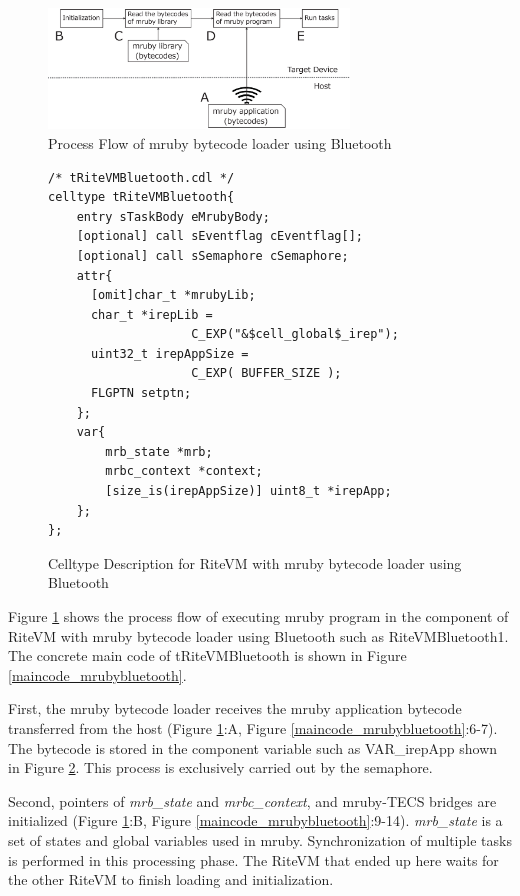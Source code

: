 \documentclass{sig-alternate-05-2015}
\begin{document}
\begin{figure}[t]
    \centering
    \includegraphics[width=8cm,clip]{figure/control_flow.eps}
    \caption{Process Flow of mruby bytecode loader using Bluetooth}
    \label{fig:control_flow}
\end{figure}

\begin{figure}[t]
\centering
\begin{lstlisting}
/* tRiteVMBluetooth.cdl */
celltype tRiteVMBluetooth{
    entry sTaskBody eMrubyBody;
    [optional] call sEventflag cEventflag[];
    [optional] call sSemaphore cSemaphore;
    attr{
      [omit]char_t *mrubyLib;
      char_t *irepLib = 
                    C_EXP("&$cell_global$_irep");
      uint32_t irepAppSize = 
                    C_EXP( BUFFER_SIZE );
      FLGPTN setptn;
    };
    var{
        mrb_state *mrb;
        mrbc_context *context;
        [size_is(irepAppSize)] uint8_t *irepApp;
    };
};
\end{lstlisting}
\caption{Celltype Description for RiteVM with mruby bytecode loader using Bluetooth}
\label{celltype_mrubybluetooth}
\end{figure}

Figure \ref{fig:control_flow} shows the process flow of executing mruby program in the component of RiteVM with mruby bytecode loader using Bluetooth such as RiteVMBluetooth1.
The concrete main code of tRiteVMBluetooth is shown in Figure \ref{maincode_mrubybluetooth}.

First, the mruby bytecode loader receives the mruby application bytecode transferred from the host (Figure \ref{fig:control_flow}:A, Figure \ref{maincode_mrubybluetooth}:6-7).
The bytecode is stored in the component variable such as VAR\_irepApp shown in Figure \ref{celltype_mrubybluetooth}.
This process is exclusively carried out by the semaphore.

Second, pointers of {\it mrb\_state} and {\it mrbc\_context}, and mruby-TECS bridges are initialized (Figure \ref{fig:control_flow}:B, Figure \ref{maincode_mrubybluetooth}:9-14).
{\it mrb\_state} is a set of states and global variables used in mruby.
Synchronization of multiple tasks is performed in this processing phase.
The RiteVM that ended up here waits for the other RiteVM to finish loading and initialization.
\end{document}
